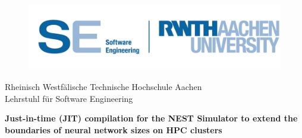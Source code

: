 %

\setcounter{page}{1}

\thispagestyle{headings}


\begin{titlepage}
	
\begin{figure}\raggedleft\includegraphics[height=3.0cm]{src/pic/logo.jpg}\end{figure}
  

\vspace*{-1.5em}

\begin{flushleft}
  {  
  	{\LARGE
      Rheinisch Westfälische Technische Hochschule Aachen \\
      Lehrstuhl für Software Engineering \\}
    \vspace{3em}
  
    {\LARGE \textbf{Just-in-time (JIT) compilation for the NEST Simulator to extend the boundaries of neural network sizes on HPC clusters}\\}
    
    \emptyLine%
    \emptyLine%
    \emptyLine%
    \vspace{3em}
		
}
\end{flushleft}
\end{titlepage}
